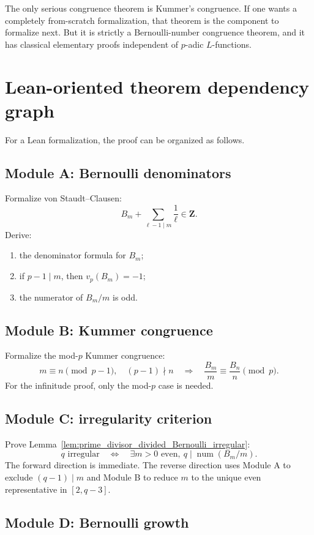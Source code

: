 \documentclass[11pt]{article}
\newcommand{\Z}{\mathbf Z}
\newcommand{\num}{\operatorname{num}}
\begin{document}
The only serious congruence theorem is Kummer's congruence.  If one wants a completely from-scratch formalization, that theorem is the component to formalize next.  But it is strictly a Bernoulli-number congruence theorem, and it has classical elementary proofs independent of $p$-adic $L$-functions.

\section{Lean-oriented theorem dependency graph}

For a Lean formalization, the proof can be organized as follows.

\subsection*{Module A: Bernoulli denominators}

Formalize von Staudt--Clausen:
\[
  B_m+\sum_{\ell-1\mid m}\frac1\ell\in\Z.
\]
Derive:
\begin{enumerate}[label=(A\arabic*)]
  \item the denominator formula for $B_m$;
  \item if $p-1\mid m$, then $v_p(B_m)=-1$;
  \item the numerator of $B_m/m$ is odd.
\end{enumerate}

\subsection*{Module B: Kummer congruence}

Formalize the mod-$p$ Kummer congruence:
\[
  m\equiv n\pmod{p-1},\quad (p-1)\nmid n
  \quad\Longrightarrow\quad
  \frac{B_m}{m}\equiv\frac{B_n}{n}\pmod p.
\]
For the infinitude proof, only the mod-$p$ case is needed.

\subsection*{Module C: irregularity criterion}

Prove Lemma~\ref{lem:prime_divisor_divided_Bernoulli_irregular}:
\[
  q\text{ irregular}
  \quad\Longleftrightarrow\quad
  \exists m>0\text{ even},\ q\mid \num(B_m/m).
\]
The forward direction is immediate.  The reverse direction uses Module A to exclude $(q-1)\mid m$ and Module B to reduce $m$ to the unique even representative in $[2,q-3]$.

\subsection*{Module D: Bernoulli growth}
\end{document}

